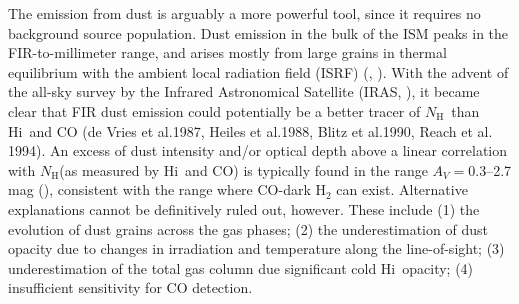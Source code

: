 \documentclass[preprint]{emulateapj}
\def\av{$A_{V}$}
\def\h2{H$_2$}
\def\hi{H{\sc i}}
\def\LH{$L_{H}$}
\def\NH{$N_\mathrm{H}$}
\begin{document}
The emission from dust is arguably a more powerful tool, since it requires no background source population. Dust emission in the bulk of the ISM peaks in the FIR-to-millimeter range, and arises mostly from large grains in thermal equilibrium with the ambient local radiation field (ISRF) (\citealt{Draine2003}, \citealt{Draine2007}). %
With the advent of the all-sky survey by the Infrared Astronomical Satellite (IRAS, \citealt{Neugebauer1984}), it became clear that FIR dust emission could potentially be a better tracer of \NH\ than \hi\ and CO (de Vries et al.1987, Heiles et al.1988, Blitz et al.1990, Reach et al. 1994). %
An %
excess of dust intensity and/or optical depth above a linear correlation with \NH (as measured by \hi\ and CO) is typically found %
in the range $A_V=0.3$--2.7 mag %
(\citealt{PLC2011,PLC2014,PlanckInt2014,Martin2012}), consistent with the range where CO-dark H$_2$ can exist. Alternative explanations cannot be definitively ruled out, however. These include (1) the evolution of dust grains across the gas phases; (2) the underestimation of dust opacity due to changes in irradiation and temperature along the line-of-sight; %
(3) underestimation of the total gas column due significant cold \hi\ opacity; (4) insufficient sensitivity for CO detection. %
\end{document}

